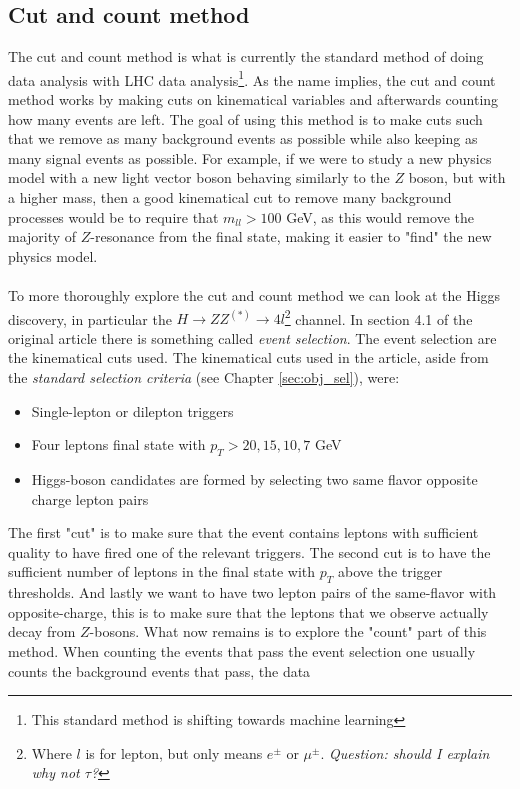 \documentclass[12pt, a4paper]{book}
\begin{document}
\subsection{Cut and count method}
The cut and count method is what is currently the standard method of doing data analysis with LHC data analysis\footnote{This standard method is shifting towards machine learning}. As the name implies, the cut and count method works by making cuts on kinematical variables and afterwards counting how many events are left. 
The goal of using this method is to make cuts such that we remove as many background events as possible while also keeping as many signal events as possible. For example, if we were to study a new physics model with a new light vector boson behaving similarly to the $Z$ boson, but with a higher mass, 
then a good kinematical cut to remove many background processes would be to require that $m_{ll}>100$ GeV, as this would remove the majority of $Z$-resonance from the final state, making it easier to "find" the new physics model. \\
\\To more thoroughly explore the cut and count method we can look at the Higgs discovery, in particular the $H\rightarrow ZZ^{(*)} \rightarrow 4l$\footnote{Where $l$ is for lepton, but only means $e^\pm$ or $\mu^\pm$. \textit{Question: should I explain why not $\tau$?}} channel. 
In section 4.1 of the original article \cite{Higgs_discovery_2012} there is something called \textit{event selection}. The event selection are the kinematical cuts used. The kinematical cuts used in the article, aside from the \textit{standard selection criteria} 
(see Chapter \ref{sec:obj_sel}), were:
\begin{itemize}
    \item Single-lepton or dilepton triggers
    \item Four leptons final state with $p_T >20,15,10,7$ GeV
    \item Higgs-boson candidates are formed by selecting two same flavor opposite charge lepton pairs
\end{itemize}
The first "cut" is to make sure that the event contains leptons with sufficient quality to have fired one of the relevant triggers. The second cut is to have the sufficient number of leptons in the final state with $p_T$ above the trigger thresholds. And lastly we want to have two lepton pairs of the same-flavor 
with opposite-charge, this is to make sure that the leptons that we observe actually decay from $Z$-bosons. What now remains is to explore the "count" part of this method. When counting the events that pass the event selection one usually counts the background events that pass, the data 
\end{document}
